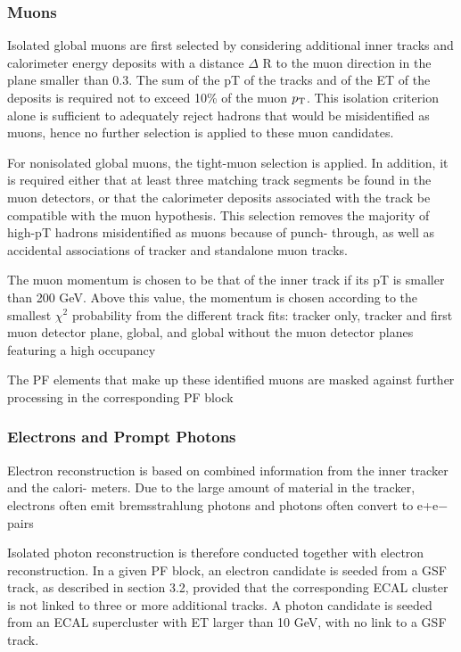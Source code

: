 \subsubsection{Muons}

Isolated global muons are first selected by considering additional inner tracks and calorimeter 
energy deposits with a distance $\Delta$ R to the muon direction in the \etaphi plane smaller than 0.3. 
The sum of the pT of the tracks and of the ET of the deposits is required not to exceed 10\% of the 
muon $p_\mathrm{T}$. This isolation criterion alone is sufficient to adequately reject hadrons that would be 
misidentified as muons, hence no further selection is applied to these muon candidates.

For nonisolated global muons, the tight-muon selection is applied. In addition, it is required either that at least three matching track segments be found in the muon detectors, or that the calorimeter deposits associated with the track be compatible with the muon hypothesis. This selection removes the majority of high-pT hadrons misidentified as muons because of punch- through, as well as accidental associations of tracker and standalone muon tracks.

The muon momentum is chosen to be that of the inner track if its pT is smaller than 200 GeV. Above this value, the momentum is chosen according to the smallest $\chi^2$ probability from the different track fits: tracker only, tracker and first muon detector plane, global, and global without the muon detector planes featuring a high occupancy

The PF elements that make up these identified muons are masked against further processing in the corresponding PF block

\subsubsection{Electrons and Prompt Photons}

Electron reconstruction is based on combined information from the inner tracker and the calori- meters. Due to the large amount of material in the tracker, electrons often emit bremsstrahlung photons and photons often convert to e+e− pairs

Isolated photon reconstruction is therefore conducted together with electron reconstruction. In a given PF block, an electron candidate is seeded from a GSF track, as described in section 3.2, provided that the corresponding ECAL cluster is not linked to three or more additional tracks. A photon candidate is seeded from an ECAL supercluster with ET larger than 10 GeV, with no link to a GSF track.

